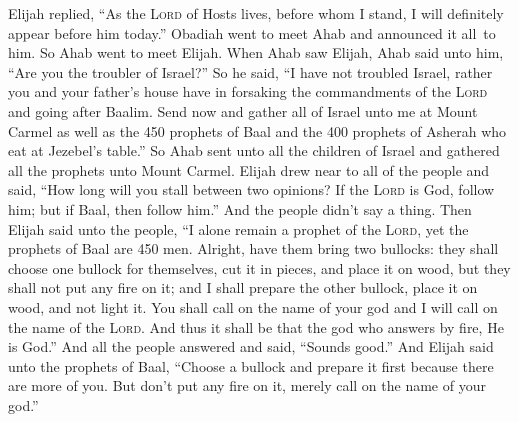 \begin{inparaenum}
   Elijah replied, ``As the \textsc{Lord} of Hosts lives, before whom I stand, I will definitely appear before him today.''%
   Obadiah went to meet Ahab and announced it all\understood\ to him. So Ahab went to meet Elijah.%
   When Ahab saw Elijah, Ahab said unto him, ``Are you the troubler of Israel?''%
   So he said, ``I have not troubled Israel, rather you and your father's house have in forsaking the commandments of the \textsc{Lord} and going after Baalim.%
   Send now and gather all of Israel unto me at Mount Carmel as well as the 450 prophets of Baal and the 400 prophets of Asherah who eat at Jezebel's table.''%
   So Ahab sent unto all the children of Israel and gathered all the prophets unto Mount Carmel.%
   Elijah drew near to all of the people and said, ``How long will you stall between two opinions? If the \textsc{Lord} is God, follow him; but if Baal, then follow him.'' And the people didn't say a thing.%
   Then Elijah said unto the people, ``I alone remain a prophet of the \textsc{Lord}, yet the prophets of Baal are 450 men.%
   Alright, have them bring two bullocks: they shall choose one bullock for themselves, cut it in pieces, and place it on wood, but they shall not put any fire on it; and I shall prepare the other bullock, place it on wood, and not light it.%
   You shall call on the name of your god and I will call on the name of the \textsc{Lord}. And thus it shall be that the god who answers by fire, He is God.'' And all the people answered and said, ``Sounds good.''%
   And Elijah said unto the prophets of Baal, ``Choose a bullock and prepare it first because there are more of you. But don't put any fire on it, merely call on the name of your god.''%

\end{inparaenum}
